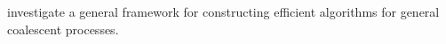 \documentclass{article}
\newcommand{\IN}{\ensuremath{\mathds{N}}}%
\newcommand{\one}[1]{\ensuremath{\mathds{1}_{\left\{ #1 \right\}}}}%
\begin{document}
\cite{Becheler2020}  investigate a general framework for  constructing efficient algorithms for general  coalescent processes.   


\begin{comment}%
A coalescent process is a continuous-time Markov process taking values among the
partitions of $\IN := \{1,2, \ldots \}$, such that the restriction to
any finite $n \in \IN $ takes values among partitions of
$[n] := \{1, 2, \ldots, n\}$.  Write $\one{A} = 1$ if $A$ holds, and zero otherwise.   Let $\cP_n$ denote the set of
partitions of $[n]$.  In the classical Kingman-coalescent, the only
possible transitions are the mergers of pairs of blocks (elements of a
partition $\pi \in \cP_n$), one pair at a time.  The $n$ leaves
(corresponding to the sampled DNA sequences) are arbitrarily labelled
from 1 to $n$, and  the blocks of a partition represent the common ancestors
of the labels of each block.    The initial state is  (usually) taken as 
$\{ \{1\}, \ldots, \{n\}\}$, and the final state, i.e.\ when the most 
recent common ancester is reached, as $\{ [n]\}$. A block in a partition of
$[n]$ represents an ancestor of the leaves in the block, i.e.\ the block
$\{i_1, \ldots, i_k\}$ in a given partition of $[n]$ is an ancestor of the
$k$ leaves $i_1, \ldots, i_k \in [n]$, and the leaves  correspond to
arbitrarily labelled DNA sequences in the sample.  
\end{comment}




\end{document}
